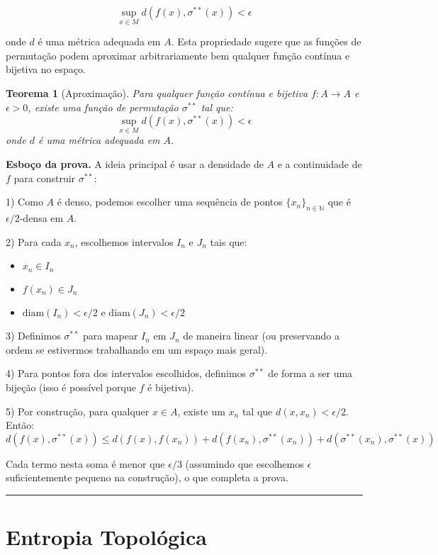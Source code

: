 \documentclass[12pt,a4paper]{article}
\newtheorem{theorem}{Teorema}
\newenvironment{proof}[1][Prova]{\textbf{#1.} }{\ \rule{0.5em}{0.5em}}
\begin{document}
\begin{equation}
\sup_{x \in M} d(f(x), \sigma^{**}(x)) < \epsilon
\end{equation}

onde $d$ é uma métrica adequada em $A$. Esta propriedade sugere que as funções de permutação podem aproximar arbitrariamente bem qualquer função contínua e bijetiva no espaço.

\begin{theorem}[Aproximação]
Para qualquer função contínua e bijetiva $f: A \to A$ e $\epsilon > 0$, existe uma função de permutação $\sigma^{**}$ tal que:
\[\sup_{x \in M} d(f(x), \sigma^{**}(x)) < \epsilon\]
onde $d$ é uma métrica adequada em $A$.
\end{theorem}

\begin{proof}[Esboço da prova]
A ideia principal é usar a densidade de $A$ e a continuidade de $f$ para construir $\sigma^{**}$:

1) Como $A$ é denso, podemos escolher uma sequência de pontos $\{x_n\}_{n\in\mathbb{N}}$ que é $\epsilon/2$-densa em $A$.

2) Para cada $x_n$, escolhemos intervalos $I_n$ e $J_n$ tais que:
   \begin{itemize}
   \item $x_n \in I_n$
   \item $f(x_n) \in J_n$
   \item $\text{diam}(I_n) < \epsilon/2$ e $\text{diam}(J_n) < \epsilon/2$
   \end{itemize}

3) Definimos $\sigma^{**}$ para mapear $I_n$ em $J_n$ de maneira linear (ou preservando a ordem se estivermos trabalhando em um espaço mais geral).

4) Para pontos fora dos intervalos escolhidos, definimos $\sigma^{**}$ de forma a ser uma bijeção (isso é possível porque $f$ é bijetiva).

5) Por construção, para qualquer $x \in A$, existe um $x_n$ tal que $d(x, x_n) < \epsilon/2$. Então:
   \[d(f(x), \sigma^{**}(x)) \leq d(f(x), f(x_n)) + d(f(x_n), \sigma^{**}(x_n)) + d(\sigma^{**}(x_n), \sigma^{**}(x))\]

   Cada termo nesta soma é menor que $\epsilon/3$ (assumindo que escolhemos $\epsilon$ suficientemente pequeno na construção), o que completa a prova.
\end{proof}
   

\section{Entropia Topológica}
\end{document}
